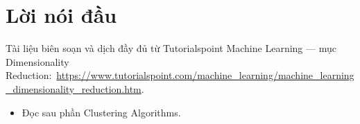 \documentclass[12pt,a4paper]{article}
\newcommand{\tsurl}[1]{\url{#1}}
\begin{document}

\newpage
\tableofcontents
\newpage

\section*{Lời nói đầu}

\begin{ynghia}[title={Nguồn}]
Tài liệu biên soạn và dịch đầy đủ từ Tutorialspoint Machine Learning --- mục Dimensionality Reduction:\ \tsurl{https://www.tutorialspoint.com/machine_learning/machine_learning_dimensionality_reduction.htm}.
\end{ynghia}

\begin{phuongphap}[title={Cách dùng}]
\begin{itemize}
  \item Đọc sau phần Clustering Algorithms.
\end{itemize}
\end{phuongphap}

\newpage










\end{document}
